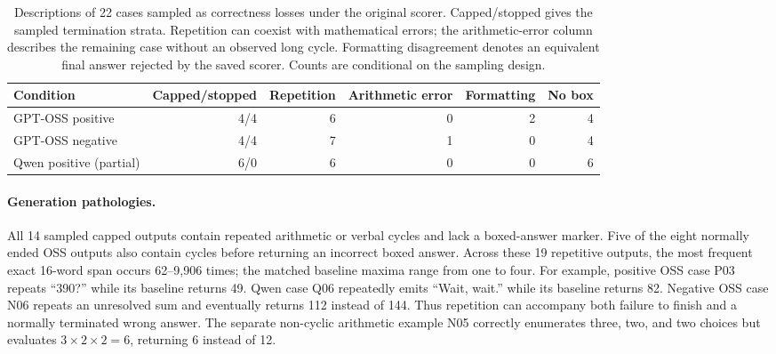 \documentclass[12pt,a4paper,twoside,openright]{book}
\begin{document}
\begin{table}[!ht]
\centering\small
\caption{Descriptions of 22 cases sampled as correctness losses under the original scorer. Capped/stopped gives the sampled termination strata. Repetition can coexist with mathematical errors; the arithmetic-error column describes the remaining case without an observed long cycle. Formatting disagreement denotes an equivalent final answer rejected by the saved scorer. Counts are conditional on the sampling design.}
\label{tab:paper-failure-review}
\begin{adjustbox}{max width=\linewidth}%
\begin{tabular}{lrrrrr}
\toprule
Condition & Capped/stopped & Repetition & Arithmetic error & Formatting & No box \\
\midrule
GPT-OSS positive & 4/4 & 6 & 0 & 2 & 4 \\
GPT-OSS negative & 4/4 & 7 & 1 & 0 & 4 \\
Qwen positive (partial) & 6/0 & 6 & 0 & 0 & 6 \\
\bottomrule
\end{tabular}
\end{adjustbox}
\end{table}

\paragraph{Generation pathologies.}
All 14 sampled capped outputs contain repeated arithmetic or verbal
cycles and lack a boxed-answer marker. Five of the eight normally ended
OSS outputs also contain cycles before returning an incorrect boxed
answer. Across these 19 repetitive outputs, the most frequent exact
16-word span occurs 62--9,906 times; the matched baseline maxima range
from one to four. For example, positive OSS case P03 repeats
\enquote{390?} while its baseline returns 49. Qwen case Q06 repeatedly
emits ``Wait, wait.'' while its baseline returns 82. Negative OSS case
N06 repeats an unresolved sum and eventually returns 112 instead of 144.
Thus repetition can accompany both failure to finish and a normally
terminated wrong answer. The separate non-cyclic arithmetic example N05
correctly enumerates three, two, and two choices but evaluates
$3\times2\times2=6$, returning 6 instead of 12.
\end{document}
